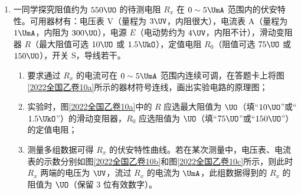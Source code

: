 \documentclass[\gkver]{gaokaozhenti}
\begin{document}
\begin{enumerate}
回答下列问题：
\begin{enumerate}
	\item
	根据表中数据可判断该飞行器在这段时间内近似做匀加速运动，判断的理由是：

	；
	\item
	当 $x = 507\Um$ 时，该飞行器速度的大小 $v = $ $\Ums$；
	\item
	这段时间内该飞行器加速度的大小 $a = $ $\Umsq$（保留 2 位有效数字）。
\end{enumerate}


\item
一同学探究阻值约为 $550\UO$ 的待测电阻 $R_{x}$ 在 $0\sim 5\UmA$ 范围内的伏安特性。可用器材有：电压表 V（量程为 $3\UV$，内阻很大），电流表 A（量程为 $1\UmA$，内阻为 $300\UO$），电源 $E$（电动势约为 $4\UV$，内阻不计），滑动变阻器 $R$（最大阻值可选 $10\UO$ 或 $1.5\UkO$），定值电阻 $R_{0}$（阻值可选 $75\UO$ 或 $150\UO$），开关 S，导线若干。
\begin{enumerate}
	\item
	要求通过 $R_{x}$ 的电流可在 $0\sim 5\UmA$ 范围内连续可调，在答题卡上将图\ref{2022全国乙卷10a}所示的器材符号连线，画出实验电路的原理图\tkanswer[2cm]{}；
	\item
	实验时，图\ref{2022全国乙卷10a}中的 $R$ 应选最大阻值为 $\UO$（填“$10\UO$”或“$1.5\UkO$”）的滑动变阻器，$R_{0}$ 应选阻值为 $\UO$（填“$75\UO$”或“$150\UO$”）的定值电阻；
	\item
	测量多组数据可得 $R_{x}$ 的伏安特性曲线。若在某次测量中，电压表、电流表的示数分别如图\ref{2022全国乙卷10b}和图\ref{2022全国乙卷10c}所示，则此时 $R_{x}$ 两端的电压为 $\UV$，流过 $R_{x}$ 的电流为 $\UmA$，此组数据得到的 $R_{x}$ 的阻值为 $\UO$（保留 3 位有效数字）。
\end{enumerate}


\end{enumerate}
\end{document}
